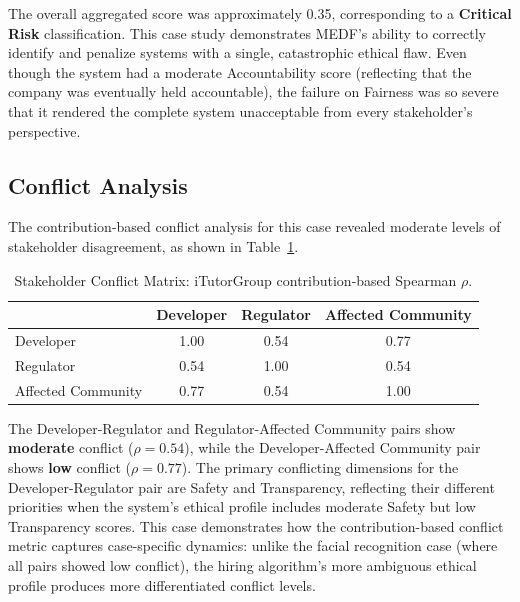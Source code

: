 The overall aggregated score was approximately 0.35, corresponding to a \textbf{Critical Risk} classification. This case study demonstrates MEDF's ability to correctly identify and penalize systems with a single, catastrophic ethical flaw. Even though the system had a moderate Accountability score (reflecting that the company was eventually held accountable), the failure on Fairness was so severe that it rendered the complete system unacceptable from every stakeholder's perspective.

\subsection{Conflict Analysis}

The contribution-based conflict analysis for this case revealed moderate levels of stakeholder disagreement, as shown in Table~\ref{tab:cs2_conflict}.

\begin{table}[H]
\centering
\caption{Stakeholder Conflict Matrix: iTutorGroup contribution-based Spearman $\rho$.}
\label{tab:cs2_conflict}
\begin{tabular}{@{}lccc@{}}
\toprule
 & \textbf{Developer} & \textbf{Regulator} & \textbf{Affected Community} \\
\midrule
Developer           & 1.00 &  0.54 &  0.77 \\
Regulator           & 0.54 &  1.00 &  0.54 \\
Affected Community  & 0.77 &  0.54 &  1.00 \\
\bottomrule
\end{tabular}
\end{table}

The Developer-Regulator and Regulator-Affected Community pairs show \textbf{moderate} conflict ($\rho = 0.54$), while the Developer-Affected Community pair shows \textbf{low} conflict ($\rho = 0.77$). The primary conflicting dimensions for the Developer-Regulator pair are Safety and Transparency, reflecting their different priorities when the system's ethical profile includes moderate Safety but low Transparency scores. This case demonstrates how the contribution-based conflict metric captures case-specific dynamics: unlike the facial recognition case (where all pairs showed low conflict), the hiring algorithm's more ambiguous ethical profile produces more differentiated conflict levels.

